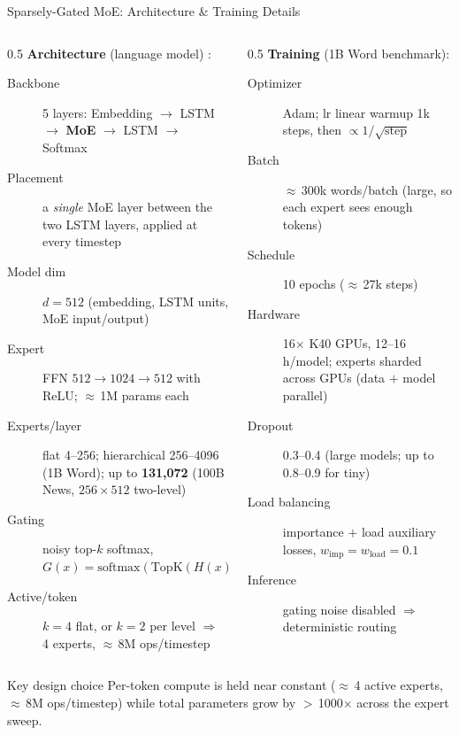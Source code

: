 \begin{frame}{Sparsely-Gated MoE: Architecture \& Training Details}

  \begin{columns}
    \begin{column}{0.5\textwidth}
      \textbf{Architecture} (language model) \cite{shazeer2017moe}:
      \begin{description}
        \item[Backbone] 5 layers: Embedding $\to$ LSTM $\to$ \textbf{MoE} $\to$ LSTM $\to$ Softmax
        \item[Placement] a \emph{single} MoE layer between the two LSTM layers, applied at every timestep
        \item[Model dim] $d{=}512$ (embedding, LSTM units, MoE input/output)
        \item[Expert] FFN $512\!\to\!1024\!\to\!512$ with ReLU; $\approx$\,1M params each
        \item[Experts/layer] flat 4--256; hierarchical 256--4096 (1B Word); up to \textbf{131{,}072} (100B News, $256{\times}512$ two-level)
        \item[Gating] noisy top-$k$ softmax, $G(x){=}\mathrm{softmax}(\mathrm{TopK}(H(x),k))$
        \item[Active/token] $k{=}4$ flat, or $k{=}2$ per level $\Rightarrow$ 4 experts, $\approx$\,8M ops/timestep
      \end{description}
    \end{column}
    \begin{column}{0.5\textwidth}
      \textbf{Training} (1B Word benchmark):
      \begin{description}
        \item[Optimizer] Adam; lr linear warmup 1k steps, then $\propto 1/\sqrt{\text{step}}$
        \item[Batch] $\approx$\,300k words/batch (large, so each expert sees enough tokens)
        \item[Schedule] 10 epochs ($\approx$\,27k steps)
        \item[Hardware] 16$\times$ K40 GPUs, 12--16\,h/model; experts sharded across GPUs (data $+$ model parallel)
        \item[Dropout] 0.3--0.4 (large models; up to 0.8--0.9 for tiny)
        \item[Load balancing] importance $+$ load auxiliary losses, $w_{\text{imp}}{=}w_{\text{load}}{=}0.1$
        \item[Inference] gating noise disabled $\Rightarrow$ deterministic routing
      \end{description}
    \end{column}
  \end{columns}

  \vspace{0.3em}
  \begin{block}{Key design choice}
    Per-token compute is held near constant ($\approx$\,4 active experts, $\approx$\,8M ops/timestep) while total parameters grow by $>$\,1000$\times$ across the expert sweep.
  \end{block}
\end{frame}

